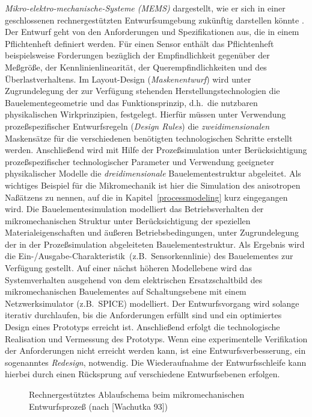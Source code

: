 {\em Mikro-elektro-mechanische-Systeme (MEMS)}
dargestellt, wie er sich in einer geschlossenen rechnergestützten
Entwurfsumgebung zukünftig darstellen könnte \cite{Wac93}.
Der Entwurf geht von
den Anforderungen und Spezifikationen aus, die in einem Pflichtenheft
definiert werden. Für einen Sensor enthält das Pflichtenheft
beispielsweise Forderungen bezüglich der Empfindlichkeit gegenüber der
Meßgröße, der Kennlinienlinearität, der Querempfindlichkeiten und des
Überlastverhaltens. Im Layout-Design ({\sl Maskenentwurf}) wird unter
Zugrundelegung der zur Verfügung stehenden Herstellungstechnologien die
Bauelementegeometrie und das Funktionsprinzip, d.h.\ die nutzbaren
physikalischen Wirkprinzipien, festgelegt. Hierfür müssen unter Verwendung
prozeßspezifischer Entwurfsregeln ({\sl Design Rules}) die
{\em zweidimensionalen}
Maskensätze für die verschiedenen benötigten technologischen Schritte
erstellt werden.
%
Anschließend wird mit Hilfe der Prozeßsimulation unter Berücksichtigung
prozeßspezifischer technologischer Parameter und Verwendung geeigneter
physikalischer Modelle die {\em dreidimensionale} Bauelementestruktur
abgeleitet. Als wichtiges Beispiel für die Mikromechanik ist hier die
Simulation des anisotropen Naßätzens zu nennen, auf die in
Kapitel~\ref{processmodeling} kurz eingegangen wird.
%
Die Bauelementesimulation modelliert das Betriebsverhalten
der mikromechanischen Struktur unter Berücksichtigung der speziellen
Materialeigenschaften und äußeren Betriebsbedingungen, unter Zugrundelegung
der in der Prozeßsimulation abgeleiteten Bauelementestruktur. Als Ergebnis
wird die \glqq Ein-/Ausgabe-Charakteristik\grqq \, (z.B.\ Sensorkennlinie)
des Bauelementes zur Verfügung gestellt.
%
Auf einer nächst höheren Modellebene wird das Systemverhalten ausgehend von
dem elektrischen Ersatzschaltbild des mikromechanischen Bauelementes auf
Schaltungsebene mit einem Netzwerksimulator (z.B.\ {\sf SPICE})
modelliert. Der Entwurfsvorgang wird solange iterativ durchlaufen, bis
die Anforderungen erfüllt sind und ein optimiertes Design eines
Prototyps erreicht ist. Anschließend erfolgt die technologische
Realisation und Vermessung des Prototyps. Wenn eine experimentelle
Verifikation der Anforderungen nicht erreicht werden kann, ist eine
Entwurfsverbesserung, ein sogenanntes {\em Redesign}, notwendig. Die
Wiederaufnahme der Entwurfsschleife kann hierbei durch einen Rücksprung
auf verschiedene Entwurfsebenen erfolgen.
\begin{figure}[htb]
\begin{center}

\setabbee
\end{center}
\caption{\label{abbmems}
 Rechnergestütztes Ablaufschema beim mikromechanischen Entwurfsprozeß
 (nach [Wachutka 93])}
\end{figure}

